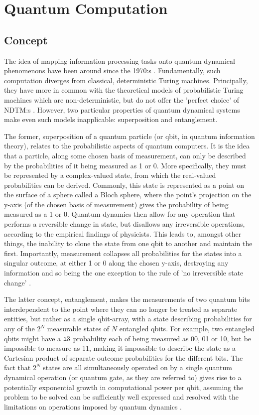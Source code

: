 \documentclass[msc,lith,english]{liuthesis}
\begin{document}
\section{Quantum Computation}

\subsection{Concept}
The idea of mapping information processing tasks onto quantum dynamical phenomenons have been around since the 1970:s \cite{QCQI}. Fundamentally, such computation diverges from classical, deterministic Turing machines. Principally, they have more in common with the theoretical models of probabilistic Turing machines which are non-deterministic, but do not offer the 'perfect choice' of NDTM:s \cite{CCAMA}. However, two particular properties of quantum dynamical systems make even such models inapplicable: superposition and entanglement. 

The former, superposition of a quantum particle (or qbit, in quantum information theory), relates to the probabilistic aspects of quantum computers. It is the idea that a particle, along some chosen basis of measurement, can only be described by the probabilities of it being measured as 1 or 0. More specifically, they must be represented by a complex-valued state, from which the real-valued probabilities can be derived. Commonly, this state is represented as a point on the surface of a sphere called a Bloch sphere, where the point's projection on the y-axis (of the chosen basis of measurement) gives the probability of being measured as a 1 or 0. Quantum dynamics then allow for any operation that performs a reversible change in state, but disallows any irreversible operations, according to the empirical findings of physicists. This leads to, amongst other things, the inability to clone the state from one qbit to another and maintain the first. Importantly, measurement collapses all probabilities for the states into a singular outcome, at either 1 or 0 along the chosen y-axis, destroying any information and so being the one exception to the rule of 'no irreversible state change' \cite{QCQI}.

The latter concept, entanglement, makes the measurements of two quantum bits interdependent to the point where they can no longer be treated as separate entities, but rather as a single qbit-array, with a state describing probabilities for any of the $2^N$ measurable states of $N$ entangled qbits. For example, two entangled qbits might have a $\frak{1}{3}$ probability each of being measured as 00, 01 or 10, but be impossible to measure as 11, making it impossible to describe the state as a Cartesian product of separate outcome probabilities for the different bits. The fact that $2^N$ states are all simultaneously operated on by a single quantum dynamical operation (or quantum gate, as they are referred to) gives rise to a potentially exponential growth in computational power per qbit, assuming the problem to be solved can be sufficiently well expressed and resolved with the limitations on operations imposed by quantum dynamics \cite{QCQI}\cite{EIQC}. 
\end{document}
